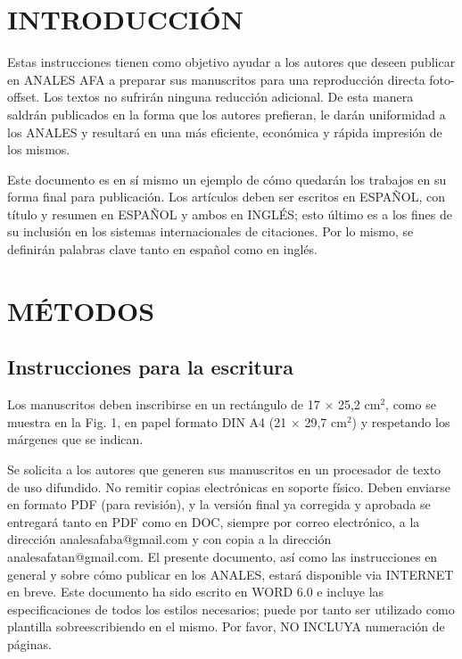 \documentclass[10pt,twocolumn]{article}
\newcommand\cauthemail[1]{\footnotetext{#1}}
\begin{document}
\thispagestyle{empty}

\setcounter{footnote}{1}
\cauthemail{zgamma@citedef.gob.ar}  %

\section{INTRODUCCIÓN}
Estas instrucciones tienen como objetivo ayudar a los autores que deseen publicar en ANALES AFA a preparar sus manuscritos para una reproducción directa foto-offset. Los textos no sufrirán ninguna reducción adicional. De esta manera saldrán publicados en la forma que los autores prefieran, le darán uniformidad a los ANALES y resultará en una más eficiente, económica y rápida impresión de los mismos. 

Este documento es en sí mismo un ejemplo de cómo quedarán los trabajos en su forma final para publicación. Los artículos deben ser escritos en ESPAÑOL, con título y resumen en ESPAÑOL y ambos en INGLÉS; esto último es a los fines de su inclusión en los sistemas internacionales de citaciones. Por lo mismo, se definirán palabras clave tanto en español como en inglés.


\section{MÉTODOS}
\subsection{Instrucciones para la escritura}
Los manuscritos deben inscribirse en un rectángulo de 17 $\times$ 25,2 cm$^2$, como se muestra en la Fig. 1, en papel formato DIN A4 (21 $\times$ 29,7 cm$^2$) y respetando los márgenes que se indican.

Se solicita a los autores que generen sus manuscritos en un procesador de texto de uso difundido. No remitir copias electrónicas en soporte físico. Deben enviarse en formato PDF (para revisión), y la versión final ya corregida y aprobada se entregará tanto en PDF como en DOC, siempre por correo electrónico, a la dirección analesafaba@gmail.com y con copia a la dirección analesafatan@gmail.com. 
El presente documento, así como las instrucciones en general y sobre cómo publicar en los ANALES, estará disponible via INTERNET en breve. Este documento ha sido escrito en WORD 6.0 e incluye las especificaciones de todos los estilos necesarios; puede por tanto ser utilizado como plantilla sobreescribiendo en el mismo. Por favor, NO INCLUYA numeración de páginas.
\end{document}

